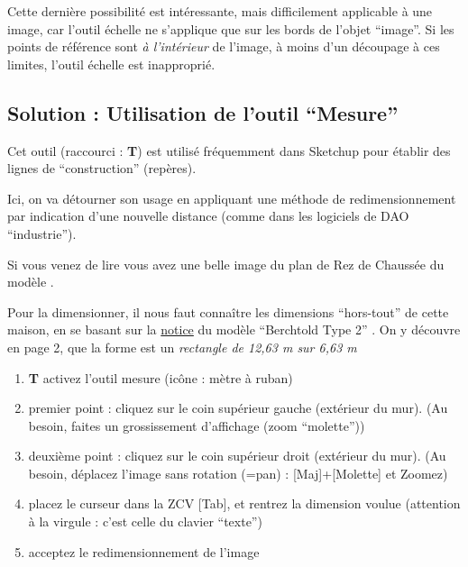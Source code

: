 \documentclass[a4paper,12pt,french]{sphinxmanual}
\begin{document}
Cette dernière possibilité est intéressante, mais difficilement applicable à une image, car l'outil échelle ne s'applique que sur les bords de l'objet ``image''. Si les points de référence sont \emph{à l'intérieur} de l'image, à moins d'un découpage à ces limites, l'outil échelle est inapproprié.


\subsection{Solution : Utilisation de l'outil ``Mesure''}
\label{su/redimensionnement-images-outil-mesure:solution-utilisation-de-l-outil-mesure}
Cet outil (raccourci : \textbf{T}) est utilisé fréquemment dans Sketchup pour établir des lignes de ``construction'' (repères).

Ici, on va détourner son usage en appliquant une méthode de redimensionnement par indication d'une nouvelle distance (comme dans les logiciels de DAO ``industrie'').

Si vous venez de lire {\hyperref[su/import\string-ssqu:import\string-ssqu]{}} vous avez une belle image du plan de Rez de Chaussée du modèle .

Pour la dimensionner, il nous faut connaître les dimensions ``hors-tout'' de cette maison, en se basant sur la \href{http://www.fixhaus.at/Berchtold\%20Typ2.pdf}{notice} du modèle ``Berchtold Type 2'' . On y découvre en page 2, que la forme est un \emph{rectangle de 12,63 m sur 6,63 m}
\begin{enumerate}
\item {} 
\textbf{T} activez l'outil mesure (icône : mètre à ruban)

\item {} 
premier point : cliquez sur le coin supérieur gauche (extérieur du mur). (Au besoin, faites un grossissement d'affichage (zoom ``molette''))

\item {} 
deuxième point : cliquez sur le coin supérieur droit (extérieur du mur). (Au besoin, déplacez l'image sans rotation (=pan) : {[}Maj{]}+{[}Molette{]} et Zoomez)

\item {} 
placez le curseur dans la ZCV {[}Tab{]}, et rentrez la dimension voulue  (attention à la virgule : c'est celle du clavier ``texte'')

\item {} 
acceptez le redimensionnement de l'image

\end{enumerate}
\end{document}
